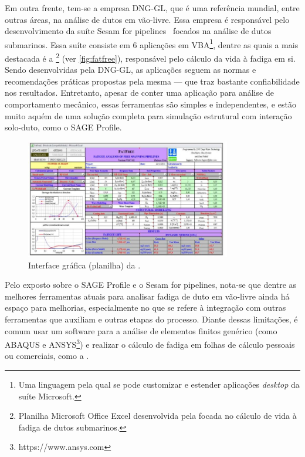 Em outra frente, tem-se a empresa DNG-GL, que é uma referência mundial, entre outras áreas, na análise de dutos em vão-livre.
Essa empresa é responsável pelo desenvolvimento da suíte Sesam for pipelines~\cite{dnvsesam} focados na análise de dutos submarinos.
Essa suíte consiste em 6 aplicações em VBA\footnote{Uma linguagem pela qual se pode customizar e estender aplicações \textit{desktop} da suíte Microsoft.}, dentre as quais a mais destacada é a \fatfree\footnote{Planilha Microsoft Office Excel desenvolvida pela  focada no cálculo de vida à fadiga de dutos submarinos.} (ver \autoref{fig:fatfree}), responsável pelo cálculo da vida à fadiga em si. Sendo desenvolvidas pela DNG-GL, as aplicações seguem as normas e recomendações práticas propostas pela mesma --- que traz bastante confiabilidade nos resultados. Entretanto, apesar de conter uma aplicação para análise de comportamento mecânico, essas ferramentas são simples e independentes, e estão muito aquém de uma solução completa para simulação estrutural com interação solo-duto, como o SAGE Profile. %

\begin{figure}[!ht]
    \centering
    \caption{Interface gráfica (planilha) da \fatfree.}\label{fig:fatfree}
    \includegraphics[width=0.8\textwidth]{imagens/fatfree}
\end{figure}

Pelo exposto sobre o SAGE Profile e o Sesam for pipelines, nota-se que dentre as melhores ferramentas atuais para analisar fadiga de duto em vão-livre ainda há espaço para melhorias, especialmente no que se refere à integração com outras ferramentas que auxiliam e outras etapas do processo. Diante dessas limitações, é comum usar um software para a análise de elementos finitos genérico (como ABAQUS e ANSYS\footnote{https://www.ansys.com}) e realizar o cálculo de fadiga em folhas de cálculo pessoais ou comerciais, como a \fatfree.

